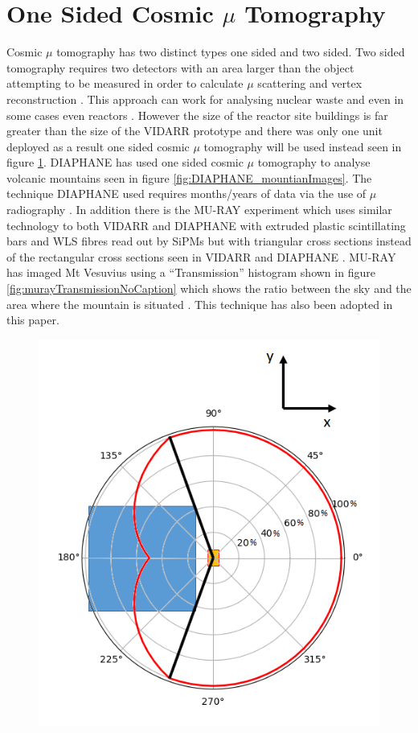 \documentclass[12pt,a4paper]{article}
\begin{document}
\section{One Sided Cosmic $\mu$ Tomography}
Cosmic $\mu$ tomography has two distinct types one sided and two sided. Two sided tomography requires two detectors with an area larger than the object attempting to be measured in order to calculate $\mu$ scattering and vertex reconstruction \cite{schultz_2007}. This approach can work for analysing nuclear waste \cite{Jonkmans_2013} and even in some cases even reactors \cite{miyadera2013imaging}. However the size of the reactor site buildings is far greater than the size of the VIDARR prototype and there was only one unit deployed as a result one sided cosmic $\mu$ tomography will be used instead seen in figure \ref{fig:oneSidedMuTomography}. DIAPHANE has used one sided cosmic $\mu$ tomography to analyse volcanic mountains seen in figure \ref{fig:DIAPHANE_mountianImages}. The technique DIAPHANE used requires months/years of data via the use of $\mu$ radiography \cite{Marteau_2017}. In addition there is the MU-RAY experiment which uses similar technology to both VIDARR and DIAPHANE with extruded plastic scintillating bars and WLS fibres read out by SiPMs but with triangular cross sections instead of the rectangular cross sections seen in VIDARR and DIAPHANE \cite{ANASTASIO2013423}. MU-RAY has imaged Mt Vesuvius using a ``Transmission'' histogram shown in figure \ref{fig:murayTransmissionNoCaption} which shows the ratio between the sky and the area where the mountain is situated \cite{Ambrosino_2014}. This technique has also been adopted in this paper.

\begin{figure}[H]
 \centering
 \includegraphics[width=0.5\linewidth]{oneSidedMuTomography.png}
 \label{fig:oneSidedMuTomography}
\end{figure}
\end{document}
